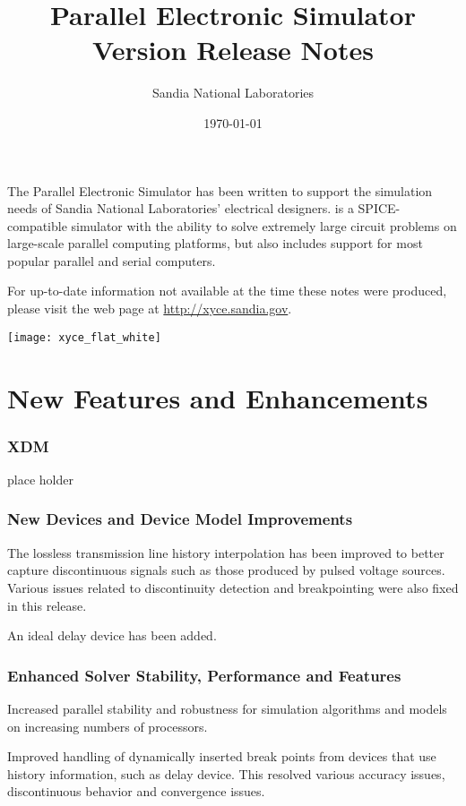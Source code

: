 \documentclass[letterpaper]{scrartcl}
\title{\XyceTitle{} Parallel Electronic Simulator\\
Version \XyceVersionVar{} Release Notes}
\author{ Sandia National Laboratories}
\date{\today}
\begin{document}
\maketitle

The \XyceTM{} Parallel Electronic Simulator has been written to support the
simulation needs of Sandia National Laboratories' electrical designers.
\XyceTM{} is a SPICE-compatible simulator with the ability to solve extremely
large circuit problems on large-scale parallel computing platforms, but also
includes support for most popular parallel and serial computers.

For up-to-date information not available at the time these notes were produced,
please visit the \XyceTM{} web page at
{\color{XyceDeepRed}\url{http://xyce.sandia.gov}}.

\tableofcontents
\vspace*{\fill}
\parbox{\textwidth}
{
  \hfill
  \texttt{[image: xyce\_flat\_white]}
}


\newpage
\section{New Features and Enhancements}

\subsubsection*{XDM}
\begin{XyceItemize}
  \item place holder
\end{XyceItemize}

\subsubsection*{New Devices and Device Model Improvements}
\begin{XyceItemize}
  \item The lossless transmission line history interpolation has been
    improved to better capture discontinuous signals such as those
    produced by pulsed voltage sources.  Various issues related to
    discontinuity detection and breakpointing were also fixed in this
    release.
  \item An ideal delay device has been added.
\end{XyceItemize}

\subsubsection*{Enhanced Solver Stability, Performance and Features}
\begin{XyceItemize}
  \item Increased parallel stability and robustness for simulation algorithms and models
        on increasing numbers of processors.
  \item Improved handling of dynamically inserted break points from devices that use history information,
	such as delay device. This resolved various accuracy issues, discontinuous behavior and convergence issues.
\end{XyceItemize}
\end{document}
